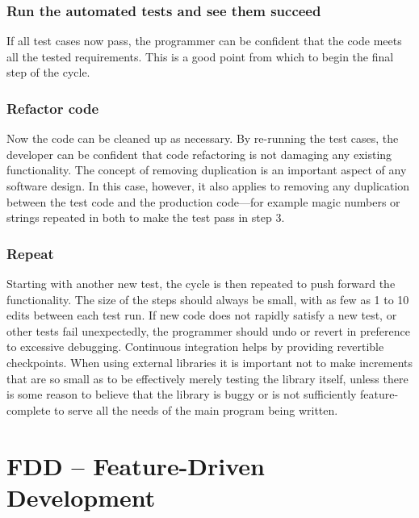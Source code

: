 \subsubsection{Run the automated tests and see them succeed}

If all test cases now pass, the programmer can be confident that the code meets all the tested requirements. This is a good point from which to begin the final step of the cycle.

\subsubsection{Refactor code}

Now the code can be cleaned up as necessary. By re-running the test cases, the developer can be confident that code refactoring is not damaging any existing functionality. The concept of removing duplication is an important aspect of any software design. In this case, however, it also applies to removing any duplication between the test code and the production code—for example magic numbers or strings repeated in both to make the test pass in step 3.

\subsubsection{Repeat}

Starting with another new test, the cycle is then repeated to push forward the functionality. The size of the steps should always be small, with as few as 1 to 10 edits between each test run. If new code does not rapidly satisfy a new test, or other tests fail unexpectedly, the programmer should undo or revert in preference to excessive debugging. Continuous integration helps by providing revertible checkpoints. When using external libraries it is important not to make increments that are so small as to be effectively merely testing the library itself, unless there is some reason to believe that the library is buggy or is not sufficiently feature-complete to serve all the needs of the main program being written.



\section{FDD -- Feature-Driven Development}

